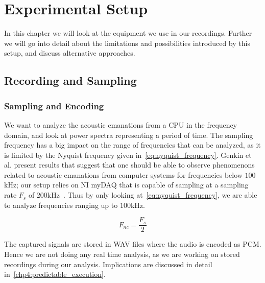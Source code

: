 \chapter{Experimental Setup}
\label{chp:experimental_setup}
In this chapter we will look at the equipment we use in our recordings.
Further we will go into detail about the limitations and possibilities introduced by this setup, and discuss alternative approaches.


\section{Recording and Sampling}\label{chp3:sec:microphone_selection}

\subsection{Sampling and Encoding}
We want to analyze the acoustic emanations from a \gls{CPU} in the frequency domain, and look at power spectra representing a period of time.
The sampling frequency has a big impact on the range of frequencies that can be analyzed, as it is limited by the Nyquist frequency given in~\autoref{eq:nyquist_frequency}.
Genkin et al. present results that suggest that one should be able to observe phenomenons related to acoustic emanations from computer systems for frequencies below \(100\)kHz; our setup relies on \gls{NI} myDAQ that is capable of sampling at a sampling rate \({F_{s}}\) of \(200\)kHz~\footnotemark.
Thus by only looking at~\autoref{eq:nyquist_frequency}, we are able to analyze frequencies ranging up to \(100\)kHz.



\begin{equation}\label{eq:nyquist_frequency}
F_{nc} = \frac{F_{s}}{2}
\end{equation}

The captured signals are stored in WAV files where the audio is encoded as \gls{PCM}.
Hence we are not doing any real time analysis, as we are working on stored recordings during our analysis.
Implications are discussed in detail in~\autoref{chp4:predictable_execution}.


